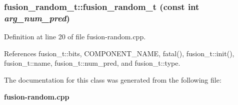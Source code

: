 \subsubsection[{fusion\_\-random\_\-t}]{\setlength{\rightskip}{0pt plus 5cm}fusion\_\-random\_\-t::fusion\_\-random\_\-t (const int {\em arg\_\-num\_\-pred})\hspace{0.3cm}{\tt  [inline]}}\label{classfusion__random__t_c7a64dc43d150d5995100b3e6a6a92ca}




Definition at line 20 of file fusion-random.cpp.

References fusion\_\-t::bits, COMPONENT\_\-NAME, fatal(), fusion\_\-t::init(), fusion\_\-t::name, fusion\_\-t::num\_\-pred, and fusion\_\-t::type.

The documentation for this class was generated from the following file:\begin{CompactItemize}
\item 
{\bf fusion-random.cpp}\end{CompactItemize}
